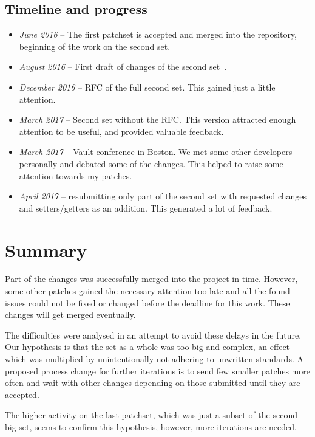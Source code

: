 \subsection{Timeline and progress}

\begin{itemize}
	\item {\em June 2016} -- The first patchset is accepted and merged into
		the repository, beginning of the work on the second set.
	\item {\em August 2016} -- First draft of changes of the second set~\cite{secondSetPreRFC}.
	\item {\em December 2016} -- RFC of the full second set. This gained just a little attention.
	\item {\em March 2017} -- Second set without the RFC. This version attracted enough attention to be useful, and provided valuable feedback.
	\item {\em March 2017} -- Vault conference in Boston. We met some other developers personally and debated some of the changes. This helped to raise some attention towards my patches.
	\item {\em April 2017} -- resubmitting only part of the second set with requested changes and setters/getters as an addition. This generated a lot of feedback.
\end{itemize}


\section{Summary}\label{chap:refactoring:summary}

Part of the changes was successfully merged into the project in time.
However, some other patches gained the necessary attention too late and all
the found issues could not be fixed or changed before the deadline for this
work. These changes will get merged eventually.

The difficulties were analysed in an attempt to avoid these delays in the future.
Our hypothesis is that the set as a whole was too big and complex, an
effect which was multiplied by unintentionally not adhering to unwritten
standards. A proposed process change for further iterations is to send few
smaller patches more often and wait with other changes depending on those
submitted until they are accepted.

The higher activity on the last patchset, which was just a subset of the second
big set, seems to confirm this hypothesis, however, more iterations are needed.


